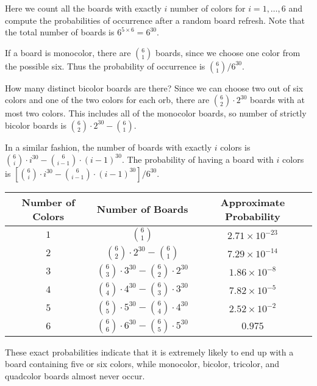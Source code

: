 \documentclass[12pt]{article}
\theoremstyle{definition}
\begin{document}
Here we count all the boards with exactly $i$ number of colors for $i=1,\dots,6$ and compute the probabilities of occurrence after a random board refresh. Note that the total number of boards is $6^{5\times 6}=6^{30}$.

If a board is monocolor, there are $\binom{6}{1}$ boards, since we choose one color from the possible six. Thus the probability of occurrence is $\binom{6}{1}/6^{30}$.

How many distinct bicolor boards are there? Since we can choose two out of six colors and one of the two colors for each orb, there are $\binom{6}{2}\cdot 2^{30}$ boards with at most two colors. This includes all of the monocolor boards, so number of strictly bicolor boards is $\binom{6}{2}\cdot 2^{30}-\binom{6}{1}$.

In a similar fashion, the number of boards with exactly $i$ colors is $\binom{6}{i}\cdot i^{30}-\binom{6}{i-1}\cdot (i-1)^{30}$. The probability of having a board with $i$ colors is $\left[\binom{6}{i}\cdot i^{30}-\binom{6}{i-1}\cdot (i-1)^{30}\right]/6^{30}$.

\begin{center}
\renewcommand{\arraystretch}{2}
    \begin{tabular}{|c|c|c|}
        \hline
        Number of Colors & Number of Boards & Approximate Probability \\
        \hline\hline
        $1$ & $\binom{6}{1}$ & $%
        2.71\times 10^{-23}$ \\
        \hline
        $2$ & $\binom{6}{2}\cdot 2^{30}-\binom{6}{1}$ & $%
        7.29\times 10^{-14}$ \\
        \hline
        $3$ & $\binom{6}{3}\cdot 3^{30}-\binom{6}{2}\cdot 2^{30}$ & $%
        1.86\times 10^{-8}$ \\
        \hline
        $4$ & $\binom{6}{4}\cdot 4^{30}-\binom{6}{3}\cdot 3^{30}$ & $%
        7.82\times 10^{-5}$ \\
        \hline
        $5$ & $\binom{6}{5}\cdot 5^{30}-\binom{6}{4}\cdot 4^{30}$ & $%
        2.52\times 10^{-2}$ \\
        \hline
        $6$ & $\binom{6}{6}\cdot 6^{30}-\binom{6}{5}\cdot 5^{30}$ & $%
        0.975$ \\
        \hline
    \end{tabular}
\renewcommand{\arraystretch}{2}
\end{center}
These exact probabilities indicate that it is extremely likely to end up with a board containing five or six colors, while monocolor, bicolor, tricolor, and quadcolor boards almost never occur. 
\end{document}
